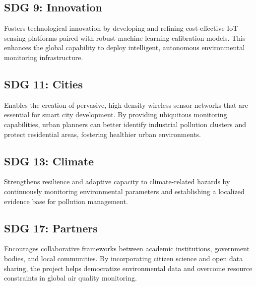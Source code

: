 \subsection{SDG 9: Innovation}
Fosters technological innovation by developing and refining cost-effective IoT sensing platforms paired with robust machine learning calibration models. This enhances the global capability to deploy intelligent, autonomous environmental monitoring infrastructure.
\subsection{SDG 11: Cities}
Enables the creation of pervasive, high-density wireless sensor networks that are essential for smart city development. By providing ubiquitous monitoring capabilities, urban planners can better identify industrial pollution clusters and protect residential areas, fostering healthier urban environments.
\subsection{SDG 13: Climate}
Strengthens resilience and adaptive capacity to climate-related hazards by continuously monitoring environmental parameters and establishing a localized evidence base for pollution management. 
\subsection{SDG 17: Partners}
Encourages collaborative frameworks between academic institutions, government bodies, and local communities. By incorporating citizen science and open data sharing, the project helps democratize environmental data and overcome resource constraints in global air quality monitoring.

